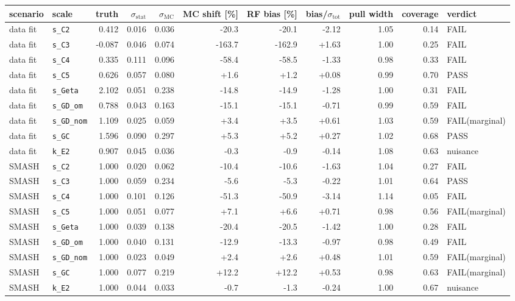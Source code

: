 \begin{tabular}{llrrrrrrrrl}
\toprule
scenario & scale & truth & $\sigma_\mathrm{stat}$ & $\sigma_\mathrm{MC}$ & MC shift [\%] & RF bias [\%] & bias/$\sigma_\mathrm{tot}$ & pull width & coverage & verdict \\
\midrule
data fit & \texttt{s\_C2} & 0.412 & 0.016 & 0.036 & -20.3 & -20.1 & -2.12 & 1.05 & 0.14 & FAIL \\
data fit & \texttt{s\_C3} & -0.087 & 0.046 & 0.074 & -163.7 & -162.9 & +1.63 & 1.00 & 0.25 & FAIL \\
data fit & \texttt{s\_C4} & 0.335 & 0.111 & 0.096 & -58.4 & -58.5 & -1.33 & 0.98 & 0.33 & FAIL \\
data fit & \texttt{s\_C5} & 0.626 & 0.057 & 0.080 & +1.6 & +1.2 & +0.08 & 0.99 & 0.70 & PASS \\
data fit & \texttt{s\_Geta} & 2.102 & 0.051 & 0.238 & -14.8 & -14.9 & -1.28 & 1.00 & 0.31 & FAIL \\
data fit & \texttt{s\_GD\_om} & 0.788 & 0.043 & 0.163 & -15.1 & -15.1 & -0.71 & 0.99 & 0.59 & FAIL \\
data fit & \texttt{s\_GD\_nom} & 1.109 & 0.025 & 0.059 & +3.4 & +3.5 & +0.61 & 1.03 & 0.59 & FAIL(marginal) \\
data fit & \texttt{s\_GC} & 1.596 & 0.090 & 0.297 & +5.3 & +5.2 & +0.27 & 1.02 & 0.68 & PASS \\
data fit & \texttt{k\_E2} & 0.907 & 0.045 & 0.036 & -0.3 & -0.9 & -0.14 & 1.08 & 0.63 & nuisance \\
\midrule
SMASH & \texttt{s\_C2} & 1.000 & 0.020 & 0.062 & -10.4 & -10.6 & -1.63 & 1.04 & 0.27 & FAIL \\
SMASH & \texttt{s\_C3} & 1.000 & 0.059 & 0.234 & -5.6 & -5.3 & -0.22 & 1.01 & 0.64 & PASS \\
SMASH & \texttt{s\_C4} & 1.000 & 0.101 & 0.126 & -51.3 & -50.9 & -3.14 & 1.14 & 0.05 & FAIL \\
SMASH & \texttt{s\_C5} & 1.000 & 0.051 & 0.077 & +7.1 & +6.6 & +0.71 & 0.98 & 0.56 & FAIL(marginal) \\
SMASH & \texttt{s\_Geta} & 1.000 & 0.039 & 0.138 & -20.4 & -20.5 & -1.42 & 1.00 & 0.28 & FAIL \\
SMASH & \texttt{s\_GD\_om} & 1.000 & 0.040 & 0.131 & -12.9 & -13.3 & -0.97 & 0.98 & 0.49 & FAIL \\
SMASH & \texttt{s\_GD\_nom} & 1.000 & 0.023 & 0.049 & +2.4 & +2.6 & +0.48 & 1.01 & 0.59 & FAIL(marginal) \\
SMASH & \texttt{s\_GC} & 1.000 & 0.077 & 0.219 & +12.2 & +12.2 & +0.53 & 0.98 & 0.63 & FAIL(marginal) \\
SMASH & \texttt{k\_E2} & 1.000 & 0.044 & 0.033 & -0.7 & -1.3 & -0.24 & 1.00 & 0.67 & nuisance \\
\bottomrule
\end{tabular}
